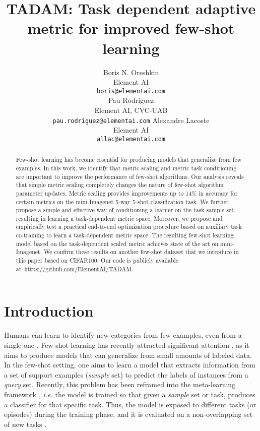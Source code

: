 \documentclass{article}
\title{TADAM: Task dependent adaptive metric for improved few-shot learning}
\author{
    Boris N. Oreshkin \\
    Element AI \\
    \texttt{boris@elementai.com} \\
    \And
    Pau Rodriguez \\
Element AI, CVC-UAB \\
    \texttt{pau.rodriguez@elementai.com}
    \And
    Alexandre Lacoste \\
    Element AI \\
    \texttt{allac@elementai.com} \\
}
\begin{document}
\maketitle

\begin{abstract}
Few-shot learning has become essential for producing models that generalize from few examples. In this work, we identify that metric scaling and metric task conditioning are important to improve the performance of few-shot algorithms. Our analysis reveals that simple metric scaling completely changes the nature of few-shot algorithm parameter updates. Metric scaling provides improvements up to 14\% in accuracy for certain metrics on the mini-Imagenet 5-way 5-shot classification task. We further propose a simple and effective way of conditioning a learner on the task sample set, resulting in learning a task-dependent metric space. Moreover, we propose and empirically test a practical end-to-end optimization procedure based on auxiliary task co-training to learn a task-dependent metric space. The resulting few-shot learning model based on the task-dependent scaled metric achieves state of the art on mini-Imagenet. We confirm these results on another few-shot dataset that we introduce in this paper based on CIFAR100.  Our code is publicly available at~\url{https://github.com/ElementAI/TADAM}.
\end{abstract}

\section{Introduction}
Humans can learn to identify new categories from few examples, even from a single one \citep{carey1978acquiring}. Few-shot learning has recently attracted significant attention  \citep{vinyals2016matching, snell2017prototypical,sung2018learning,Santoro16metalearning,munkhdalai2018rapid,mishra2018simle}, as it aims to produce models that can generalize from small amounts of labeled data. In the few-shot setting, one aims to learn a model that extracts information from a set of support examples (\emph{sample} set) to predict the labels of instances from a \emph{query} set. Recently, this problem has been reframed into the meta-learning framework \cite{ravi2016optimization}, \emph{i.e.} the model is trained so that given a \emph{sample} set or task, produces a classifier for that specific task. Thus, the model is exposed to different tasks (or episodes) during the training phase, and it is evaluated on a non-overlapping set of new tasks \citep{vinyals2016matching}.
\end{document}
